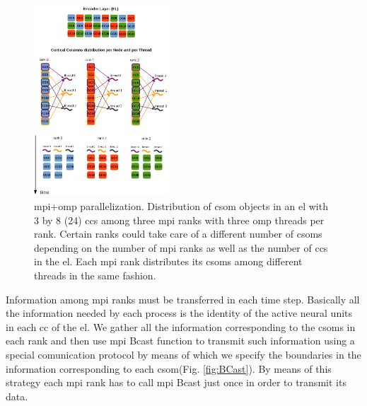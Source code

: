 \documentclass[10pt,journal,compsoc]{IEEEtran}
\begin{document}
\begin{algorithm}
	\caption{This algorithm distributes \glspl{cc} among \gls{mpi} processes in a distributed memory system and the \glspl{cc} in each process are distributed among \gls{omp} threads in a shared memory system. In this algorithm we run one \gls{mpi} process per compute node on Cooley.}
\label{ccs_distribution}
\begin{algorithmic}[1]
	\ENDFOR
\end{algorithmic}
\end{algorithm}

\begin{figure}[h!]
    \centering
    \includegraphics[width=0.45\textwidth]{Encoder_Parallelization.png}
    \caption{ \gls{mpi}+\gls{omp} parallelization. Distribution of \gls{csom} objects in an \gls{el} with 3 by 8 (24) \glspl{cc} among three \gls{mpi} ranks with three \gls{omp} threads per rank. Certain ranks could take care of a different number of \glspl{csom} depending on the number of \gls{mpi} ranks as well as the number of \glspl{cc} in the \gls{el}. Each \gls{mpi} rank distributes its \glspl{csom} among different threads in the same fashion.}
    \label{fig:Encoder_Parallelization}
\end{figure}

Information among \gls{mpi} ranks must be transferred in each time step. Basically all the information needed by each process is the identity of the active neural units in each \gls{cc} of the \gls{el}. We gather all the information corresponding to the \glspl{csom} in each rank and then use \gls{mpi} Bcast function to transmit such information using a special comunication protocol by means of which we specify the boundaries in the information corresponding to each \gls{csom}(Fig. \ref{fig:BCast}). By means of this strategy each \gls{mpi} rank has to call \gls{mpi} Bcast just once in order to transmit its data.
\end{document}
